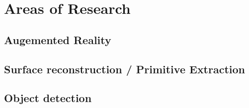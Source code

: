 \chapter{Areas of Research}


\section{Augemented Reality}


\section{Surface reconstruction / Primitive Extraction}


\section{Object detection}
